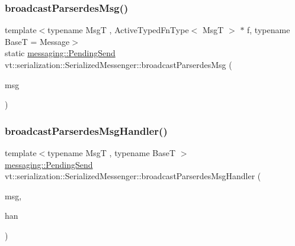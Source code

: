 \mbox{\label{structvt_1_1serialization_1_1_serialized_messenger_ab63d7ec8f331ae893e1819e3f6ec9d5c}} 
\subsubsection{\texorpdfstring{broadcast\+Parserdes\+Msg()}{broadcastParserdesMsg()}\hspace{0.1cm}{\footnotesize\ttfamily [2/2]}}
{\footnotesize\ttfamily template$<$typename MsgT , Active\+Typed\+Fn\+Type$<$ Msg\+T $>$ $\ast$ f, typename BaseT  = Message$>$ \\
static \hyperlink{structvt_1_1messaging_1_1_pending_send}{messaging\+::\+Pending\+Send} vt\+::serialization\+::\+Serialized\+Messenger\+::broadcast\+Parserdes\+Msg (\begin{DoxyParamCaption}\item[{MsgT $\ast$}]{msg }\end{DoxyParamCaption})\hspace{0.3cm}{\ttfamily [static]}}

\mbox{\label{structvt_1_1serialization_1_1_serialized_messenger_a6ccb2cff955c5ef1f60904b4f35da191}} 
\subsubsection{\texorpdfstring{broadcast\+Parserdes\+Msg\+Handler()}{broadcastParserdesMsgHandler()}}
{\footnotesize\ttfamily template$<$typename MsgT , typename BaseT $>$ \\
\hyperlink{structvt_1_1messaging_1_1_pending_send}{messaging\+::\+Pending\+Send} vt\+::serialization\+::\+Serialized\+Messenger\+::broadcast\+Parserdes\+Msg\+Handler (\begin{DoxyParamCaption}\item[{MsgT $\ast$}]{msg,  }\item[{\hyperlink{namespacevt_af64846b57dfcaf104da3ef6967917573}{Handler\+Type} const \&}]{han }\end{DoxyParamCaption})\hspace{0.3cm}{\ttfamily [static]}}

